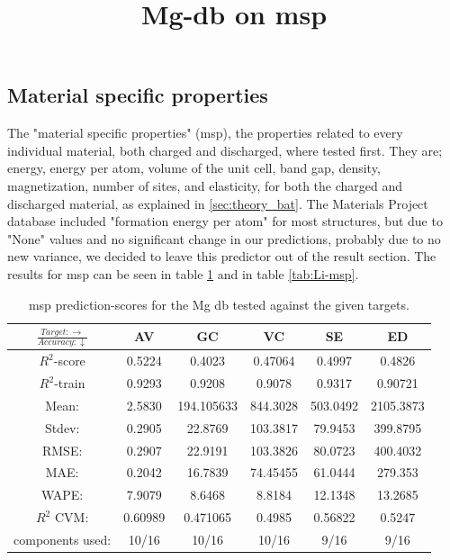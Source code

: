  
 
 
 
  
\subsection{Material specific properties}
The "material specific properties" (\ac{msp}), the properties related to every individual material, both charged and discharged, where tested first. They are; energy, energy per atom, volume of the unit cell, band gap, density, magnetization, number of sites, and elasticity, for both the charged and discharged material, as explained in \ref{sec:theory_bat}. The Materials Project database included "formation energy per atom" for most structures, but due to "None" values and no significant change in our predictions, probably due to no new variance, we decided to leave this predictor out of the result section. The results for msp can be seen in table \ref{tab:mg-msp} and in table \ref{tab:Li-msp}.

\begin{table}[H]
\scriptsize
\title{Mg-db on msp}
\centering
\caption{msp prediction-scores for the Mg db tested against the given targets.}
\begin{tabular}{|c|c|c|c|c|c|}
	\hline 
	$\frac{Target: \rightarrow}{Accuracy:\downarrow} $ & AV & GC & VC & SE & ED 
	 \\ 
	\hline
	$R^2$-score & 0.5224 & 0.4023 & 0.47064 & 0.4997 &  0.4826\\ 
	\hline 
	$R^2$-train & 0.9293 & 0.9208 & 0.9078 & 0.9317 &  0.90721 \\ 
	\hline
	Mean: &2.5830	&194.105633	&844.3028&503.0492&2105.3873	\\
	\hline 
	Stdev:&0.2905	&22.8769	&103.3817	&79.9453	&399.8795	\\
	\hline
	RMSE:&0.2907& 22.9191& 103.3826 & 80.0723 & 400.4032 \\ 
	\hline 
	MAE: &0.2042& 16.7839 &  74.45455 & 61.0444 & 279.353 \\ 
	\hline
	WAPE: & 7.9079 & 8.6468 & 8.8184  & 12.1348	& 13.2685 \\
	\hline
	$R^2$ CVM: &  0.60989 & 0.471065 & 0.4985  & 0.56822 &0.5247 \\
	\hline
	components used: & 10/16 & 10/16 & 10/16  & 9/16 &9/16 \\
	\hline
\end{tabular}
\label{tab:mg-msp}
\end{table}

